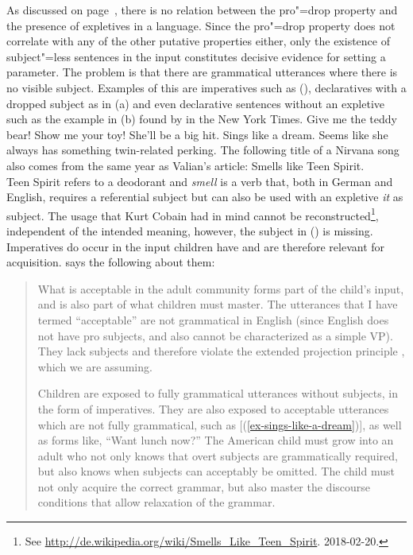 As discussed on page~\pageref{fn-Expletiva-Pro-Drop}, there is no relation between the pro"=drop property and the presence of expletives
in a language. Since the pro"=drop property does not correlate with any of the other putative properties either, only the existence
of subject"=less sentences in the input constitutes decisive evidence for setting a parameter. The problem is that there are grammatical utterances
where there is no visible subject. Examples of this are imperatives such as (), declaratives
with a dropped subject as in (a) and even declarative sentences without an expletive such as the  
example in (b) found by \citet[]{Valian91a} in the New York Times.
\eal
\label{Beispiel-Imperativ-Englisch}
\ex Give me the teddy bear!
\ex Show me your toy!
\zl
\eal
\ex She'll be a big hit. Sings like a dream.\label{ex-sings-like-a-dream}
\ex Seems like she always has something twin-related perking.
\zl
The following title of a Nirvana song also comes from the same year as Valian's article:
\ea
Smells like Teen Spirit.\\
\z
Teen Spirit refers to a deodorant and \emph{smell} is a verb that, both in German and English, requires a referential subject but can also be used with an expletive \emph{it} as subject.
The usage that Kurt Cobain had in mind cannot be reconstructed\footnote{%
  See \url{http://de.wikipedia.org/wiki/Smells_Like_Teen_Spirit}. 2018-02-20.
}, independent of the intended meaning, however, the subject in () is missing.
Imperatives do occur in the input children have and are therefore relevant for acquisition.
\citet[]{Valian91a} says the following about them:
\begin{quote}
What is acceptable in the adult community forms part of the child's input, and
is also part of what children must master. The utterances that I have termed
``acceptable'' are not grammatical in English (since English does not have pro
subjects, and also cannot be characterized as a simple VP). They lack subjects
and therefore violate the extended projection principle \citep{Chomsky81a}, which we are assuming.

   Children are exposed to fully grammatical utterances without subjects, in the
form of imperatives. They are also exposed to acceptable utterances which are
not fully grammatical, such as [(\ref{ex-sings-like-a-dream})], as well as forms like, ``Want lunch now?'' The
American child must grow into an adult who not only knows that overt subjects
are grammatically required, but also knows when subjects can acceptably be
omitted. The child must not only acquire the correct grammar, but also master
the discourse conditions that allow relaxation of the grammar. \citep[]{Valian91a}
\end{quote}
